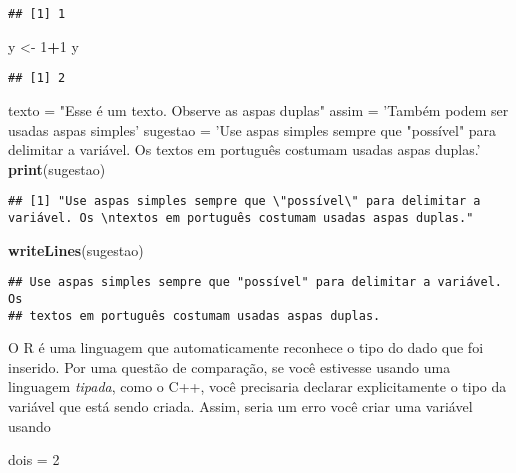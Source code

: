 \documentclass[
]{book}
\newenvironment{Shaded}{\begin{snugshade}}{\end{snugshade}}
\newcommand{\DecValTok}[1]{\textcolor[rgb]{0.00,0.00,0.81}{#1}}
\newcommand{\KeywordTok}[1]{\textcolor[rgb]{0.13,0.29,0.53}{\textbf{#1}}}
\newcommand{\NormalTok}[1]{#1}
\newcommand{\OperatorTok}[1]{\textcolor[rgb]{0.81,0.36,0.00}{\textbf{#1}}}
\newcommand{\StringTok}[1]{\textcolor[rgb]{0.31,0.60,0.02}{#1}}
\begin{document}
\begin{verbatim}
## [1] 1
\end{verbatim}

\begin{Shaded}
\begin{Highlighting}[]
\NormalTok{y <-}\StringTok{ }\DecValTok{1}\OperatorTok{+}\DecValTok{1}
\NormalTok{y}
\end{Highlighting}
\end{Shaded}

\begin{verbatim}
## [1] 2
\end{verbatim}

\begin{Shaded}
\begin{Highlighting}[]
\NormalTok{texto =}\StringTok{ "Esse é um texto. Observe as aspas duplas"}
\NormalTok{assim =}\StringTok{ 'Também podem ser usadas aspas simples'}
\NormalTok{sugestao =}\StringTok{ 'Use aspas simples sempre que "possível" para delimitar a variável. Os }
\StringTok{textos em português costumam usadas aspas duplas.'}
\KeywordTok{print}\NormalTok{(sugestao)}
\end{Highlighting}
\end{Shaded}

\begin{verbatim}
## [1] "Use aspas simples sempre que \"possível\" para delimitar a variável. Os \ntextos em português costumam usadas aspas duplas."
\end{verbatim}

\begin{Shaded}
\begin{Highlighting}[]
\KeywordTok{writeLines}\NormalTok{(sugestao)}
\end{Highlighting}
\end{Shaded}

\begin{verbatim}
## Use aspas simples sempre que "possível" para delimitar a variável. Os 
## textos em português costumam usadas aspas duplas.
\end{verbatim}

O R é uma linguagem que automaticamente reconhece o tipo do dado que foi inserido. Por uma questão de comparação, se você estivesse usando uma linguagem \emph{tipada}, como o C++, você precisaria declarar explicitamente o tipo da variável que está sendo criada. Assim, seria um erro você criar uma variável usando

\begin{Shaded}
\begin{Highlighting}[]
\NormalTok{dois =}\StringTok{ }\DecValTok{2}
\end{Highlighting}
\end{Shaded}
\end{document}
